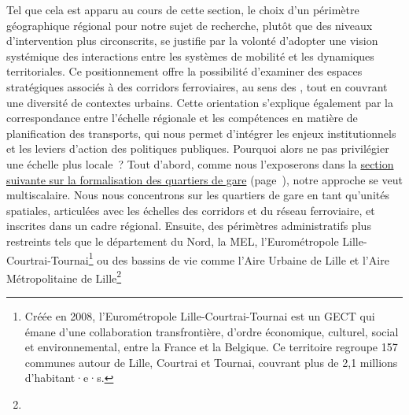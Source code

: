 \begin{refsegment}
Tel que cela est apparu au cours de cette section, le choix d’un périmètre géographique régional pour notre sujet de recherche, plutôt que des niveaux d'intervention plus circonscrits, se justifie par la volonté d’adopter une vision systémique des interactions entre les systèmes de mobilité et les dynamiques territoriales. Ce positionnement offre la possibilité d'examiner des espaces stratégiques associés à des corridors ferroviaires, au sens des  \textcolor{blue}{\autocite[63]{liu_corridors_2016}}, tout en couvrant une diversité de contextes urbains. Cette orientation s’explique également par la correspondance entre l’échelle régionale et les compétences en matière de planification des transports, qui nous permet d'intégrer les enjeux institutionnels et les leviers d’action des politiques publiques. Pourquoi alors ne pas privilégier une échelle plus locale~? Tout d’abord, comme nous l’exposerons dans la \hyperref[chap3:quartiers-gare]{section suivante sur la formalisation des quartiers de gare} (page~\pageref{chap3:quartiers-gare}), notre approche se veut multiscalaire. Nous nous concentrons sur les quartiers de gare en tant qu’unités spatiales, articulées avec les échelles des corridors et du réseau ferroviaire, et inscrites dans un cadre régional. Ensuite, des périmètres administratifs plus restreints tels que le département du Nord, la \acrfull{MEL}, l'Eurométropole Lille-Courtrai-Tournai\footnote{
    Créée en 2008, l'Eurométropole Lille-Courtrai-Tournai est un \acrfull{GECT} qui émane d'une collaboration transfrontière, d'ordre économique, culturel, social et environnemental, entre la France et la Belgique. Ce territoire regroupe 157 communes autour de Lille, Courtrai et Tournai, couvrant plus de 2,1 millions d'habitant·e·s.
} ou des bassins de vie comme l’Aire Urbaine de Lille et l'Aire Métropolitaine de Lille\footnote{
}
\end{refsegment}
